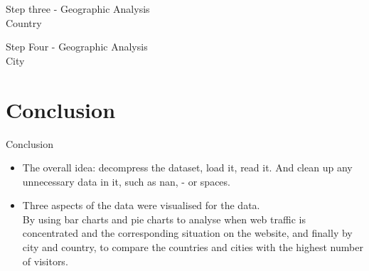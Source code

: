 \documentclass[
 size=14pt,
 paper=smartboard,  %
 mode=present, 		%
 display=slides, 	%
 style=tuliplab,  	%
 pauseslide,
 fleqn,leqno]{powerdot}
\begin{document}
\begin{slide}{Step three - Geographic Analysis\\		
	Country}

\begin{figure}[htbp]
	\centering
\end{figure}
\end{slide}

\begin{slide}[toc=,bm=]{Step Four - Geographic Analysis\\		
		City}
	\begin{figure}[htbp]
		\centering
	\end{figure}
	
\end{slide}

\section{Conclusion}

\begin{slide}[toc=,bm=]{Conclusion}
\begin{itemize}
\item
\smallskip
The overall idea: decompress the dataset, load it, read it. And clean up any unnecessary data in it, such as nan, - or spaces.

\item
\smallskip
Three aspects of the data were visualised for the data.\\

By using bar charts and pie charts to analyse when web traffic is concentrated and the corresponding situation on the website, and finally by city and country, to compare the countries and cities with the highest number of visitors.

\end{itemize}



\end{slide}
\end{document}
